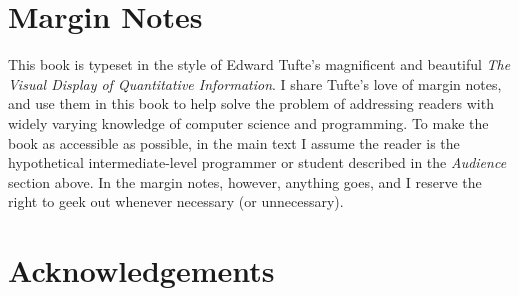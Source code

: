 \section{Margin Notes}\label{sec:preface:margin-notes}

This book is typeset in the style of Edward Tufte's
magnificent and beautiful \emph{The Visual Display of
  Quantitative Information}\cite{Tufte:1986:VDQ:33404}.  I share
Tufte's love of margin notes,
and use them in this book to help solve the problem of addressing readers with
widely varying knowledge of computer science and programming.
%
To make the book as accessible as possible, in the main text I assume
the reader is the hypothetical intermediate-level programmer or
student described in the \emph{Audience} section above.
%
In the margin notes, however, anything goes, and I reserve the right
to geek out whenever necessary (or unnecessary).







 \section{Acknowledgements}\label{sec:preface:acknowledgements}




